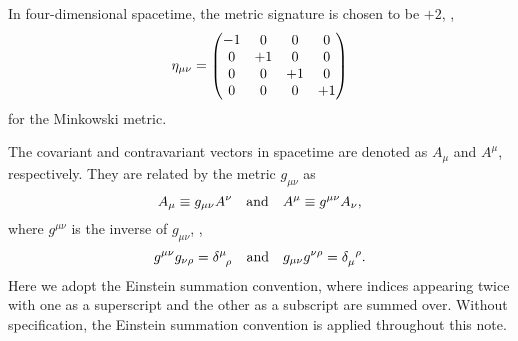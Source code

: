 \documentclass{article}
\begin{document}
            In four-dimensional spacetime, the metric signature is chosen to be $+2$, \eg,
            \begin{equation}
                \eta_{\mu\nu} = \mqty(\dmat[0]{-1, +1, +1, +1})
            \end{equation}
            for the Minkowski metric.

            The covariant and contravariant vectors in spacetime are denoted as $A_\mu$ and $A^\mu$, respectively.
            They are related by the metric $g_{\mu\nu}$ as
            \begin{equation}
                A_\mu \equiv g_{\mu\nu} A^\nu \qand A^\mu \equiv g^{\mu\nu} A_\nu,
            \end{equation}
            where $g^{\mu\nu}$ is the inverse of $g_{\mu\nu}$, \ie,
            \begin{equation}
                g^{\mu\nu} g_{\nu\rho} = \delta\indices{^\mu_\rho} \qand g_{\mu\nu} g^{\nu\rho} = \delta\indices{_\mu^\rho}.
            \end{equation}
            Here we adopt the Einstein summation convention, where indices appearing twice with one as a superscript and the other as a subscript are summed over.
            Without specification, the Einstein summation convention is applied throughout this note.
\end{document}
